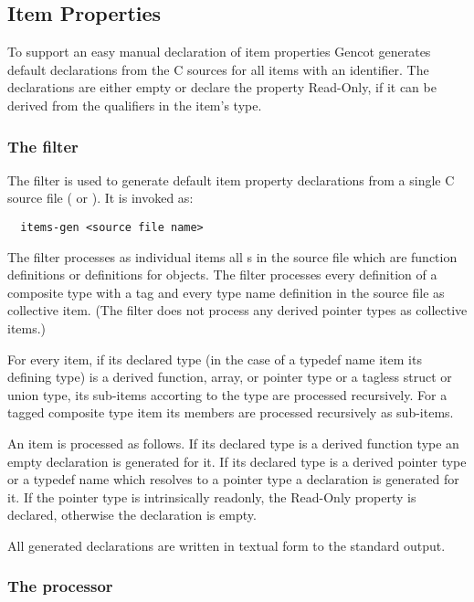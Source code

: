 \subsection{Item Properties}
\label{impl-ccomps-itemprops}

To support an easy manual declaration of item properties Gencot generates default declarations from the C sources for all 
items with an identifier. The declarations are either empty or declare the property Read-Only, if it can be derived
from the  qualifiers in the item's type. 

\subsubsection{The filter }

The filter  is used to generate default item property declarations from a single C source file ( or ).
It is invoked as:
\begin{verbatim}
  items-gen <source file name>
\end{verbatim}

The filter processes as individual items all s in the source file which are function
definitions or definitions for objects. The filter processes every definition of a composite type 
with a tag and every type name definition in the source file as collective item. (The filter does not
process any derived pointer types as collective items.)

For every item, if its declared type (in the case of a typedef name item its defining type) is
a derived function, array, or pointer type or a tagless struct or union type, its sub-items accorting to the 
type are processed recursively. For a tagged composite type item its members are processed recursively as sub-items.

An item is processed as follows. If its declared type is a derived function type an empty declaration is
generated for it. If its declared type is a derived pointer type or a typedef name which resolves to a pointer type
a declaration is generated for it. If the pointer type is intrinsically readonly, the Read-Only property is declared, 
otherwise the declaration is empty.

All generated declarations are written in textual form to the standard output.

\subsubsection{The processor }

